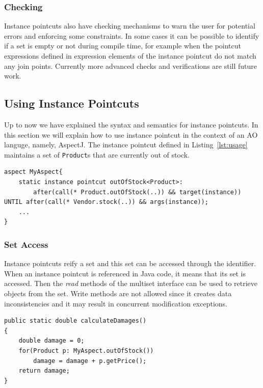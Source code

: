 \documentclass{acm_proc_article-sp}
\begin{document}
\subsubsection{Checking}
Instance pointcuts also have checking mechanisms to warn the user for potential errors and enforcing some constraints. In some cases it can be possible to identify if a set is empty or not during compile time, for example when the pointcut expressions defined in expression elements of the instance pointcut do not match any join points. 
Currently more advanced checks and verifications are still future work.

\subsection{Using Instance Pointcuts}
Up to now we have explained the syntax and semantics for instance pointcuts. In this section we will explain how to use instance pointcut in the context of an AO languge, namely, AspectJ. The instance pointcut defined in Listing~\ref{lst:usage} maintains a set of \texttt{Product}s that are currently out of stock.

\begin{lstlisting}[float=h!, caption={An instance pointcut for out of stock products}, label={lst:usage}]
aspect MyAspect{
	static instance pointcut outOfStock<Product>: 
		after(call(* Product.outOfStock(..)) && target(instance)) UNTIL after(call(* Vendor.stock(..)) && args(instance));
	...
}
\end{lstlisting}

\subsubsection{Set Access}
Instance pointcuts reify a set and this set can be accessed through the identifier. When an instance  pointcut is referenced in Java code, it means that its set is accessed. Then the \emph{read} methods of the multiset interface can be used to retrieve objects from the set. Write methods are not allowed since it creates data inconsistencies and it may result in concurrent modification exceptions. 


\begin{lstlisting}[float=h!, caption={Calculate a damage estimate for out of stock products}, label={lst:setaccess}]
public static double calculateDamages()
{
	double damage = 0;
	for(Product p: MyAspect.outOfStock())
		damage = damage + p.getPrice();
	return damage;
}
\end{lstlisting}
\end{document}
